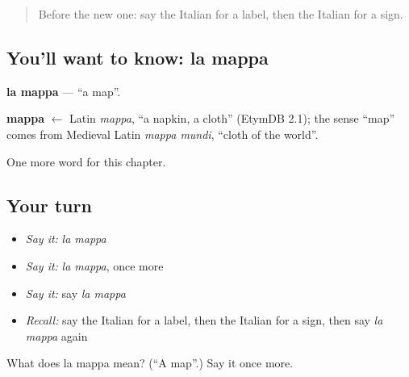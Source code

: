 \label{lesson:IT-C198-mappa}



\begin{quote}
Before the new one: say the Italian for a label, then the Italian for a sign.
\end{quote}

\subsection*{You'll want to know: la mappa}
\textbf{la mappa} — \textquotedblleft{}a map\textquotedblright{}.

\begin{cousinweb}
\textbf{mappa} $\leftarrow$ Latin \emph{mappa}, \textquotedblleft{}a napkin, a cloth\textquotedblright{} (EtymDB 2.1); the sense \textquotedblleft{}map\textquotedblright{} comes from Medieval Latin \emph{mappa mundi}, \textquotedblleft{}cloth of the world\textquotedblright{}.
\end{cousinweb}

\begin{grammarlens}[title={What you've built}]
One more word for this chapter.
\end{grammarlens}

\subsection*{Your turn}
\begin{itemize}
\raggedright
  \item \emph{Say it:} \emph{la mappa}
  \item \emph{Say it:} \emph{la mappa}, once more
  \item \emph{Say it:} say \emph{la mappa}
  \item \emph{Recall:} say the Italian for a label, then the Italian for a sign, then say \emph{la mappa} again
\end{itemize}

\begin{tcolorbox}[breakable,colback=teal!4,colframe=teal!35!black,title={Before you move on}]
What does la mappa mean? (\textquotedblleft{}A map\textquotedblright{}.) Say it once more.
\end{tcolorbox}
